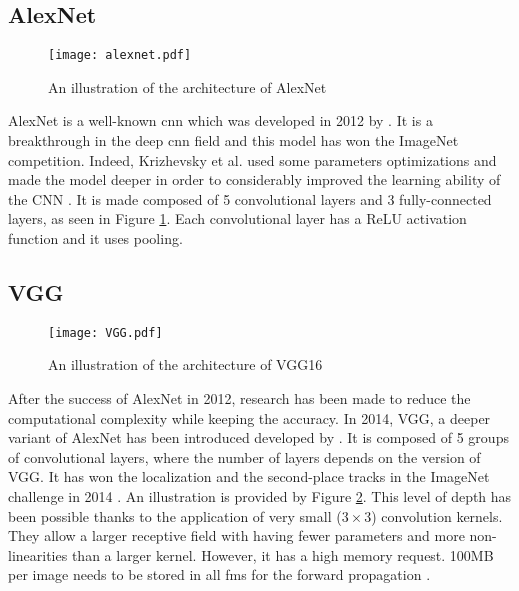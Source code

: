 \subsection{AlexNet}
%
\begin{figure}
    \centering
    \texttt{[image: alexnet.pdf]}
    \caption{An illustration of the architecture of AlexNet \cite{krizhevsky_imagenet_2012}}
    \label{fig:alexnet}
\end{figure}
%
AlexNet is a well-known \acrshort{cnn} which was developed in 2012 by \textcite{krizhevsky_imagenet_2012}. It is a breakthrough in the deep \acrshort{cnn} field and this model has won the ImageNet competition. Indeed, Krizhevsky et al. used some parameters optimizations and made the model deeper in order to considerably improved the learning ability of the CNN \cite{khan_survey_2020}. It is made composed of 5 convolutional layers and 3 fully-connected layers, as seen in Figure \ref{fig:alexnet}. Each convolutional layer has a ReLU activation function and it uses pooling.
\subsection{VGG}
%
\begin{figure}
    \centering
    \texttt{[image: VGG.pdf]}
    \caption{An illustration of the architecture of VGG16 \cite{simonyan_very_2015}}
    \label{fig:vgg}
\end{figure}
%
After the success of AlexNet in 2012, research has been made to reduce the computational complexity while keeping the accuracy. In 2014, VGG, a deeper variant of AlexNet has been introduced developed by \textcite{simonyan_very_2015}. It is composed of 5 groups of convolutional layers, where the number of layers depends on the version of VGG. It has won the localization and the second-place tracks in the ImageNet challenge in 2014 \cite{simonyan_very_2015}. An illustration is provided by Figure \ref{fig:vgg}. This level of depth has been possible thanks to the application of very small ($3 \times 3$) convolution kernels. They allow a larger receptive field with having fewer parameters and more non-linearities than a larger kernel. However, it has a high memory request. 100MB per image needs to be stored in all \acrshort{fm}s for the forward propagation \cite{matteucci_artificial_2019}.
